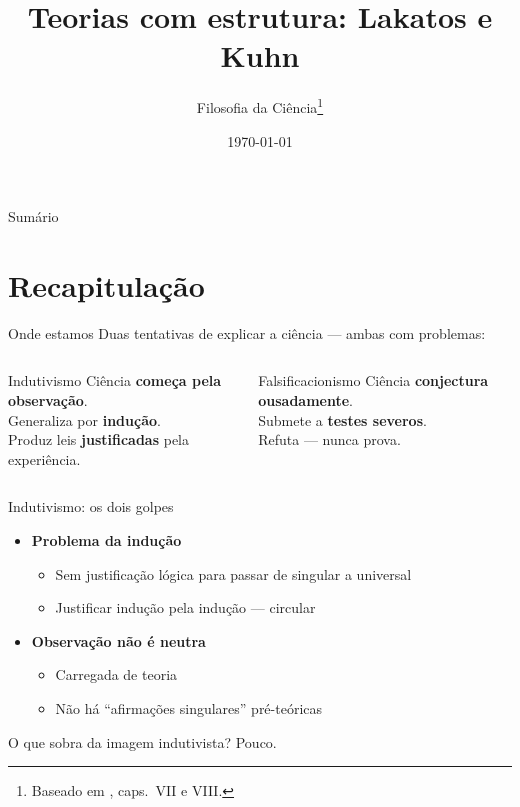 \documentclass[aspectratio=169]{beamer}
\title{Teorias com estrutura: Lakatos e Kuhn}
\author{Filosofia da Ciência\footnote{Baseado em \citet{chalmers1993}, caps.~VII e VIII.}}
\date{\today}
\newcommand{\impt}[1]{\textcolor{maccent}{\textbf{#1}}}
\newcommand{\ntc}[1]{\textcolor{mprimary}{#1}}
\begin{document}
\begin{frame}[plain]\titlepage\end{frame}

\begin{frame}{Sumário}\tableofcontents\end{frame}

\section{Recapitulação}

\begin{frame}{Onde estamos}
Duas tentativas de explicar a ciência --- ambas com problemas:
\vspace{0.4cm}
\pause
\begin{columns}[t]
\begin{block}{Indutivismo}
Ciência \impt{começa pela observação}. \\[0.15cm]
Generaliza por \impt{indução}. \\[0.15cm]
Produz leis \impt{justificadas} pela experiência.
\end{block}

\pause
\begin{block}{Falsificacionismo}
Ciência \impt{conjectura ousadamente}. \\[0.15cm]
Submete a \impt{testes severos}. \\[0.15cm]
Refuta --- nunca prova.
\end{block}
\end{columns}
\end{frame}

\begin{frame}{Indutivismo: os dois golpes}
\begin{itemize}
  \item \impt{Problema da indução}
  \begin{itemize}
    \item Sem justificação lógica para passar de singular a universal
    \item Justificar indução pela indução --- circular
  \end{itemize}
  \pause
  \vspace{0.3cm}
  \item \impt{Observação não é neutra}
  \begin{itemize}
    \item Carregada de teoria
    \item Não há ``afirmações singulares'' pré-teóricas
  \end{itemize}
\end{itemize}
\vspace{0.4cm}
\pause
\ntc{O que sobra da imagem indutivista?} Pouco.
\end{frame}
\end{document}
